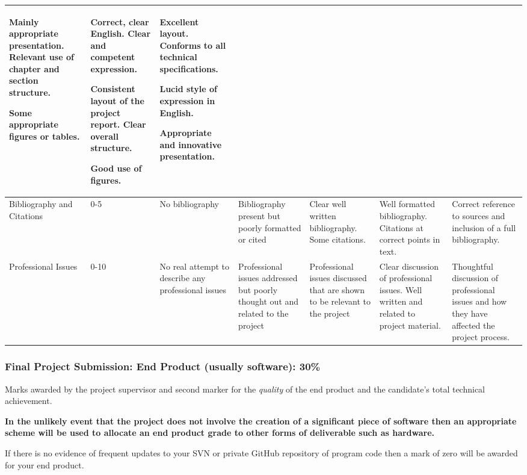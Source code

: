 \documentclass[11pt]{article}
\newcommand{\programweight}{30\% }
\begin{document}
{\begin{tabular}{||p{2cm}|p{0.8cm}|p{2.9cm}|p{2.9cm}|p{2.9cm}|p{2.9cm}|p{2.9cm}||}
Mainly appropriate
presentation. Relevant use of
chapter and section structure.

Some appropriate figures or tables.
&Correct, clear English. Clear
and competent expression.


 Consistent
layout of the project report. Clear overall structure.

Good use of figures.
 &Excellent layout. Conforms
to all technical
specifications.

Lucid style of
expression in English.

Appropriate and innovative
presentation.
\\
\hline
Bibliography and Citations & 0-5 &
No bibliography&
Bibliography present but poorly formatted or cited&
Clear well written bibliography.  Some citations.&
Well formatted bibliography.  Citations at correct points in text.
&Correct reference to sources
and inclusion of a full
bibliography.
\\
\hline
Professional Issues & 0-10 &
No real attempt to describe any professional issues&
Professional issues addressed but poorly thought out and related to  the project&
Professional issues discussed that are shown to be relevant to the project&
Clear discussion of professional issues.  Well written and related to project material.&
Thoughtful discussion of professional issues and how they have affected the project process.
\\
\hline
\hline
\end{tabular}
}


\restoregeometry


\subsubsection{Final Project Submission: End Product (usually software): \programweight}
Marks awarded by the project supervisor and second marker for the \textit{quality} of the end product and the candidate's total technical achievement.

\textbf{In the unlikely event that the project does not involve the creation of a significant piece of software then an appropriate scheme will be used to allocate an end product grade to other forms of deliverable such as hardware.}

If there is no evidence of frequent updates to your SVN or private GitHub repository of program code then a mark of zero will be awarded for your end product.
\end{document}
